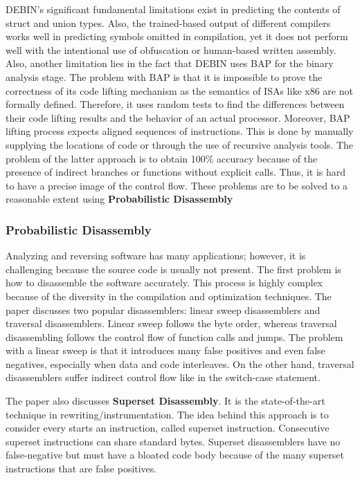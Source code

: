 \documentclass[conference,a4paper]{IEEEtran}
\begin{document}
DEBIN's significant fundamental limitations exist in predicting the contents of struct and union types. Also, the trained-based output of different compilers works well in predicting symbols omitted in compilation, yet it does not perform well with the intentional use of obfuscation or human-based written assembly. Also, another limitation lies in the fact that DEBIN uses BAP for the binary analysis stage. 
The problem with BAP is that it is impossible to prove the correctness of its code lifting mechanism as the semantics of ISAs like x86 are not formally defined. Therefore, it uses random tests to find the differences between their code lifting results and the behavior of an actual processor. Moreover, BAP lifting process expects aligned sequences of instructions. This is done by manually supplying the locations of code or through the use of recursive analysis tools.
\cite{brumley_bap_2011} The problem of the latter approach is to obtain 100\% accuracy because of the presence of indirect branches or functions without explicit calls. Thus, it is hard to have a precise image of the control flow. These problems are to be solved to a reasonable extent using \textbf{Probabilistic Disassembly}

\subsubsection{Probabilistic Disassembly}
Analyzing and reversing software has many applications; however, it is challenging because the source code is usually not present.
The first problem is how to disassemble the software accurately.
This process is highly complex because of the diversity in the compilation and optimization techniques.
The paper discusses two popular disassemblers: linear sweep disassemblers and traversal disassemblers.
Linear sweep follows the byte order, whereas traversal disassembling follows the control flow of function calls and jumps.
The problem with a linear sweep is that it introduces many false positives and even false negatives, especially when data and code interleaves. On the other hand, traversal disassemblers suffer indirect control flow like in the switch-case statement.

The paper also discusses \textbf{Superset Disassembly}. It is the state-of-the-art technique in rewriting/instrumentation. The idea behind this approach is to consider every starts an instruction, called superset instruction. Consecutive superset instructions can share standard bytes. Superset disassemblers have no false-negative but must have a bloated code body because of the many superset instructions that are false positives.
\end{document}
